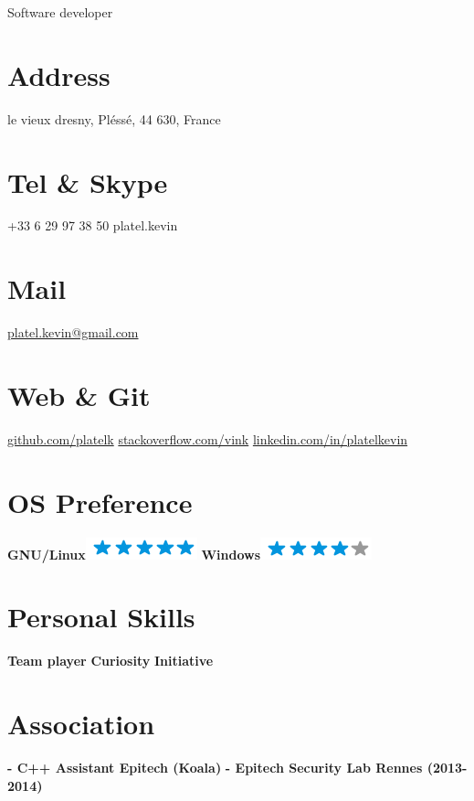 \documentclass[8pt]{friggeri-cv}
\begin{document}
\begin{samepage}
      {Software developer}
      

\begin{aside}
  \section{Address}
    le vieux dresny,
    Pléssé, 44 630,
    France
  \section{Tel \& Skype}
    +33 6 29 97 38 50
    platel.kevin
  \section{Mail}
    \href{mailto:platel.kevin@gmail.com}{platel.kevin@gmail.com}
  \section{Web \& Git}
    \href{https://github.com/platelk}{github.com/platelk}
    \href{http://stackoverflow.com/users/3676180/vink}{stackoverflow.com/vink}
    \href{http://fr.linkedin.com/in/platelkevin}{linkedin.com/in/platelkevin}
  \section{OS Preference}
    \textbf{GNU/Linux}\includegraphics[scale=0.40]{img/5stars.png}
    \textbf{Windows}\includegraphics[scale=0.40]{img/4stars.png}
  \section{Personal Skills}
    \textbf{Team player}
    \textbf{Curiosity}
    \textbf{Initiative}
  \section{Association}
    \textbf{- C++ Assistant Epitech (Koala)}
    \textbf{- Epitech Security Lab Rennes (2013-2014)}

\end{aside}
\end{samepage}
\end{document}
